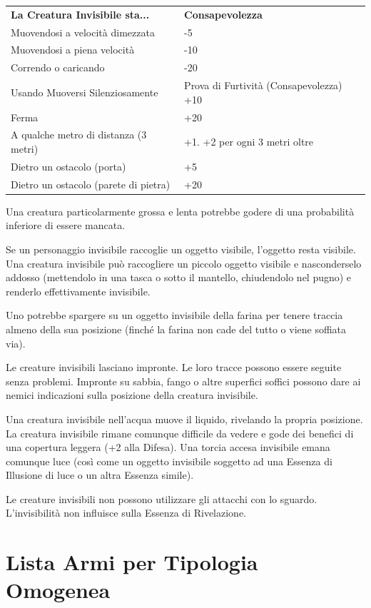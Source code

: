 \documentclass[a4paper,11pt,twoside,openany]{book}
\begin{document}
\begin{tabular}{ll}
	\toprule
	\textbf{La Creatura Invisibile sta...} & \textbf{Consapevolezza}\tabularnewline
	Muovendosi a velocità dimezzata        & -5\tabularnewline
	Muovendosi a piena velocità            & -10\tabularnewline
	Correndo o caricando                   & -20\tabularnewline
	Usando Muoversi Silenziosamente        & Prova di Furtività (Consapevolezza) +10\tabularnewline
	Ferma                                  & +20\tabularnewline
	A qualche metro di distanza (3 metri)  & +1. +2 per ogni 3 metri oltre\tabularnewline
	Dietro un ostacolo (porta)             & +5\tabularnewline
	Dietro un ostacolo (parete di pietra)  & +20\tabularnewline
\end{tabular}

\bigskip

Una creatura particolarmente grossa e lenta potrebbe godere di una probabilità inferiore di essere mancata.

Se un personaggio invisibile raccoglie un oggetto visibile, l'oggetto resta visibile. Una creatura invisibile può raccogliere un piccolo oggetto visibile e nasconderselo addosso (mettendolo in una tasca o sotto il mantello, chiudendolo nel pugno) e renderlo effettivamente invisibile.

Uno potrebbe spargere su un oggetto invisibile della farina per tenere traccia almeno della sua posizione (finché la farina non cade del tutto o viene soffiata via).

Le creature invisibili lasciano impronte. Le loro tracce possono essere seguite senza problemi. Impronte su sabbia, fango o altre superfici soffici possono dare ai nemici indicazioni sulla posizione della creatura invisibile.

Una creatura invisibile nell'acqua muove il liquido, rivelando la propria posizione. La creatura invisibile rimane comunque difficile da vedere e gode dei benefici di una copertura leggera (+2 alla Difesa).
Una torcia accesa invisibile emana comunque luce (così come un oggetto invisibile soggetto ad una Essenza di Illusione di luce o un altra Essenza simile).

Le creature invisibili non possono utilizzare gli attacchi con lo sguardo. L'invisibilità non influisce sulla Essenza di Rivelazione.

\pagebreak

\section{Lista Armi per Tipologia Omogenea}
\end{document}
